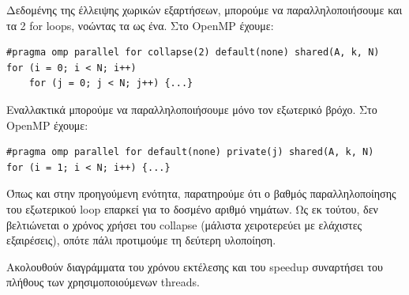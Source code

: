\documentclass[12pt,titlepage]{article}
\begin{document}
Δεδομένης της έλλειψης χωρικών εξαρτήσεων, μπορούμε να παραλληλοποιήσουμε και τα
2 for loops, νοώντας τα ως ένα. Στο OpenMP έχουμε:

\begin{verbatim}
#pragma omp parallel for collapse(2) default(none) shared(A, k, N)
for (i = 0; i < N; i++)
    for (j = 0; j < N; j++) {...}
\end{verbatim}

Εναλλακτικά μπορούμε να παραλληλοποιήσουμε μόνο τον εξωτερικό βρόχο. Στο OpenMP
έχουμε:

\begin{verbatim}
#pragma omp parallel for default(none) private(j) shared(A, k, N)
for (i = 1; i < N; i++) {...}
\end{verbatim}

Όπως και στην προηγούμενη ενότητα, παρατηρούμε ότι ο βαθμός παραλληλοποίησης
του εξωτερικού loop επαρκεί για το δοσμένο αριθμό νημάτων. Ως εκ τούτου, δεν
βελτιώνεται ο χρόνος χρήσει του collapse (μάλιστα χειροτερεύει με ελάχιστες
εξαιρέσεις), οπότε πάλι προτιμούμε τη δεύτερη υλοποίηση.

Ακολουθούν διαγράμματα του χρόνου εκτέλεσης και του speedup συναρτήσει του
πλήθους των χρησιμοποιούμενων threads.
\end{document}
